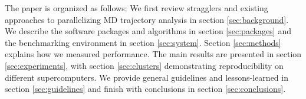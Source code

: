 The paper is organized as follows:
We first review stragglers and existing approaches to parallelizing MD trajectory analysis in section \ref{sec:background}.
We describe the software packages and algorithms in section \ref{sec:packages} and the benchmarking environment in section \ref{sec:system}.
Section \ref{sec:methods} explains how we measured performance.
The main results are presented in section \ref{sec:experiments}, with section \ref{sec:clusters} demonstrating reproducibility on different supercomputers.
We provide general guidelines and lessons-learned in section \ref{sec:guidelines} and finish with conclusions in section \ref{sec:conclusions}.
